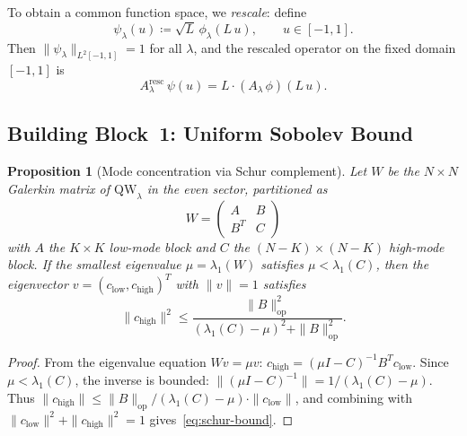 \documentclass[12pt,a4paper]{article}
\newtheorem{proposition}[theorem]{Proposition}
\theoremstyle{definition}
\theoremstyle{remark}
\begin{document}
To obtain a common function space, we \emph{rescale}: define
\begin{equation}
\label{eq:rescaled}
\psi_\lambda(u) \coloneqq \sqrt{L}\,\phi_\lambda(L\,u), \qquad u \in [-1,1].
\end{equation}
Then $\|\psi_\lambda\|_{L^2[-1,1]} = 1$ for all $\lambda$, and the rescaled operator on the fixed domain $[-1,1]$ is
\[
  A_\lambda^{\mathrm{resc}}\,\psi(u) = L \cdot (A_\lambda\,\phi)(L\,u).
\]

\subsection{Building Block~1: Uniform Sobolev Bound}

\begin{proposition}[Mode concentration via Schur complement]
\label{prop:mode-concentration}
Let $W$ be the $N \times N$ Galerkin matrix of $\mathrm{QW}_\lambda$ in the even sector, partitioned as
\[
  W = \begin{pmatrix} A & B \\ B^T & C \end{pmatrix}
\]
with $A$ the $K \times K$ low-mode block and $C$ the $(N-K) \times (N-K)$ high-mode block. If the smallest eigenvalue $\mu = \lambda_1(W)$ satisfies $\mu < \lambda_1(C)$, then the eigenvector $v = (c_{\mathrm{low}}, c_{\mathrm{high}})^T$ with $\|v\| = 1$ satisfies
\begin{equation}
\label{eq:schur-bound}
  \|c_{\mathrm{high}}\|^2 \leq \frac{\|B\|_{\mathrm{op}}^2}{(\lambda_1(C) - \mu)^2 + \|B\|_{\mathrm{op}}^2}.
\end{equation}
\end{proposition}

\begin{proof}
From the eigenvalue equation $Wv = \mu v$:
$c_{\mathrm{high}} = (\mu I - C)^{-1} B^T c_{\mathrm{low}}$.
Since $\mu < \lambda_1(C)$, the inverse is bounded: $\|(\mu I - C)^{-1}\| = 1/(\lambda_1(C) - \mu)$.
Thus $\|c_{\mathrm{high}}\| \leq \|B\|_{\mathrm{op}} / (\lambda_1(C) - \mu) \cdot \|c_{\mathrm{low}}\|$,
and combining with $\|c_{\mathrm{low}}\|^2 + \|c_{\mathrm{high}}\|^2 = 1$ gives~\eqref{eq:schur-bound}.
\end{proof}
\end{document}

